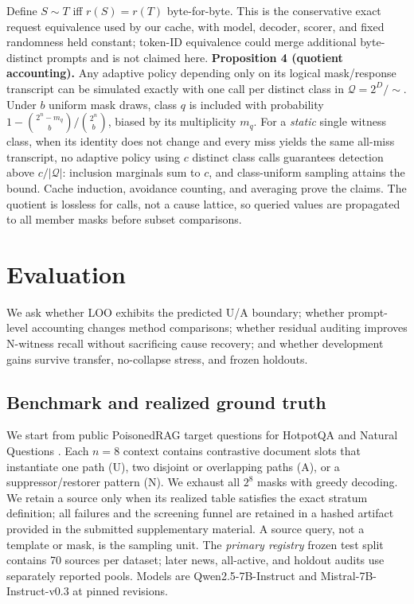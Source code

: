 \documentclass{article}
\begin{document}
Define $S\sim T$ iff $r(S)=r(T)$ byte-for-byte. This is the conservative exact
request equivalence used by our cache, with model, decoder, scorer, and fixed
randomness held constant; token-ID equivalence could merge additional byte-
distinct prompts and is not claimed here.
\textbf{Proposition 4 (quotient accounting).} Any adaptive policy depending
only on its logical mask/response transcript can be simulated exactly with one
call per distinct class in $\mathcal{Q}=2^D/{\sim}$. Under $b$ uniform mask
draws, class $q$ is included with probability
$1-\binom{2^n-m_q}{b}/\binom{2^n}{b}$, biased by its multiplicity $m_q$.
For a \emph{static} single witness class, when its identity does not change and
every miss yields the same all-miss transcript, no adaptive policy using $c$
distinct class calls guarantees detection above $c/|\mathcal Q|$: inclusion
marginals sum to $c$, and class-uniform sampling attains the bound. Cache
induction, avoidance counting, and averaging prove the claims. The quotient is lossless for calls, not a cause lattice, so
queried values are propagated to all member masks before subset comparisons.

\section{Evaluation}

We ask whether LOO exhibits the predicted U/A boundary; whether prompt-level
accounting changes method comparisons; whether residual auditing improves
N-witness recall without sacrificing cause recovery; and whether development
gains survive transfer, no-collapse stress, and frozen holdouts.

\subsection{Benchmark and realized ground truth}

We start from public PoisonedRAG target questions \cite{poisonedrag} for
HotpotQA and Natural Questions \cite{yang2018hotpot,kwiatkowski2019nq}. Each $n=8$ context contains contrastive document
slots that instantiate one path (U), two disjoint or overlapping paths (A), or a
suppressor/restorer pattern (N). We exhaust all $2^8$ masks with greedy decoding.
We retain a source only when its realized table satisfies the exact stratum
definition; all failures and the screening funnel are retained in a hashed
artifact provided in the submitted supplementary material. A source query,
not a template or mask, is the sampling unit. The \emph{primary registry} frozen
test split contains 70 sources per dataset; later news, all-active, and holdout
audits use separately reported pools. Models are Qwen2.5-7B-Instruct and
Mistral-7B-Instruct-v0.3 at pinned revisions.
\end{document}
